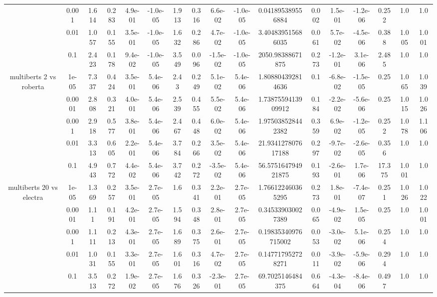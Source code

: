 \begin{tabular}{|c|c|c|c|c|c|c|c|c|c|c|c|c|c|c|c|c|}
 & 0.001 & 1.614 & 0.283 & 4.9e-01 & -1.0e-05 & 1.913 & 0.316 & 6.6e-02 & -1.0e-05 & 0.041895389556884 & 0.002 & 1.5e-01 & -1.2e-06 & 0.252 & 1.0 & 1.0 \\
 & 0.01 & 1.057 & 0.155 & 3.5e-01 & -1.0e-05 & 1.632 & 0.286 & 4.7e-02 & -1.0e-05 & 3.404839515686035 & 0.061 & 5.7e-02 & -4.5e-06 & 0.388 & 1.005 & 1.001 \\
 & 0.1 & 2.423 & 0.178 & 9.4e-02 & -1.0e-05 & 3.549 & 0.096 & -1.5e-02 & -1.0e-05 & 2050.98388671875 & 0.273 & -1.2e-01 & 3.1e-06 & 2.485 & 1.0 & 1.0 \\
\hline
\multirow{5}{*}{multiberts 2 vs roberta } & 1e-05 & 7.337 & 0.424 & 3.5e-01 & 5.4e-06 & 2.43 & 0.249 & 5.1e-02 & 5.4e-06 & 1.808804392814636 & 0.1 & -6.8e-02 & -1.5e-05 & 0.25 & 1.065 & 1.039 \\
 & 0.0001 & 2.808 & 0.321 & 4.0e-01 & 5.4e-06 & 2.539 & 0.455 & 5.5e-02 & 5.4e-06 & 1.7387559413909912 & 0.184 & -2.2e-02 & -5.6e-06 & 0.25 & 1.015 & 1.026 \\
 & 0.001 & 2.918 & 0.577 & 3.8e-01 & 5.4e-06 & 2.467 & 0.448 & 6.0e-02 & 5.4e-06 & 1.975038528442382 & 0.359 & 6.9e-02 & -1.2e-05 & 0.252 & 1.078 & 1.106 \\
 & 0.01 & 3.313 & 0.605 & 2.2e-01 & 5.4e-06 & 3.784 & 0.266 & 3.5e-02 & 5.4e-06 & 21.934127807617188 & 0.297 & -9.7e-02 & -2.6e-05 & 0.356 & 1.0 & 1.0 \\
 & 0.1 & 4.943 & 0.772 & 4.4e-02 & 5.4e-06 & 3.742 & 0.272 & -3.5e-02 & 5.4e-06 & 56.575164794921875 & 0.193 & -2.6e-01 & 1.7e-06 & 17.375 & 1.001 & 1.0 \\
\hline
\multirow{5}{*}{multiberts 20 vs electra } & 1e-05 & 1.369 & 0.257 & 3.5e-01 & 2.7e-05 & 1.6 & 0.341 & 2.2e-01 & 2.7e-05 & 1.766122460365295 & 0.273 & 1.8e-01 & -7.4e-07 & 0.251 & 1.026 & 1.022 \\
 & 0.0001 & 1.11 & 0.191 & 4.2e-01 & 2.7e-05 & 1.594 & 0.348 & 2.8e-01 & 2.7e-05 & 0.345339030027389 & 0.065 & -4.9e-02 & 1.5e-05 & 0.25 & 1.0 & 1.001 \\
 & 0.001 & 1.111 & 0.213 & 4.3e-01 & 2.7e-05 & 1.689 & 0.375 & 2.6e-01 & 2.7e-05 & 0.19835340976715002 & 0.053 & -3.0e-02 & 5.1e-06 & 0.254 & 1.0 & 1.0 \\
 & 0.01 & 1.031 & 0.155 & 3.3e-01 & 2.7e-05 & 1.601 & 0.316 & 4.7e-02 & 2.7e-05 & 0.147717952728271 & 0.011 & -3.9e-02 & -5.9e-06 & 0.294 & 1.0 & 1.0 \\
 & 0.1 & 3.513 & 0.272 & 1.9e-02 & 2.7e-05 & 1.676 & 0.326 & -2.3e-01 & 2.7e-05 & 69.7025146484375 & 0.664 & -4.3e-04 & -8.4e-06 & 0.497 & 1.0 & 1.0 \\

\end{tabular}
